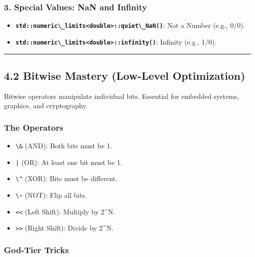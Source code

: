 \hypertarget{special-values-nan-and-infinity}{%
\subsubsection{3. Special Values: NaN and
Infinity}\label{special-values-nan-and-infinity}}

\begin{itemize}
\tightlist
\item
  \textbf{\passthrough{\lstinline!std::numeric\_limits<double>::quiet\_NaN()!}}:
  Not a Number (e.g., 0/0).
\item
  \textbf{\passthrough{\lstinline!std::numeric\_limits<double>::infinity()!}}:
  Infinity (e.g., 1/0).
\end{itemize}

\begin{center}\rule{0.5\linewidth}{0.5pt}\end{center}

\hypertarget{bitwise-mastery-low-level-optimization}{%
\subsection{4.2 Bitwise Mastery (Low-Level
Optimization)}\label{bitwise-mastery-low-level-optimization}}

Bitwise operators manipulate individual bits. Essential for embedded
systems, graphics, and cryptography.

\hypertarget{the-operators}{%
\subsubsection{The Operators}\label{the-operators}}

\begin{itemize}
\tightlist
\item
  \passthrough{\lstinline!\&!} (AND): Both bits must be 1.
\item
  \passthrough{\lstinline!|!} (OR): At least one bit must be 1.
\item
  \passthrough{\lstinline!\^!} (XOR): Bits must be different.
\item
  \passthrough{\lstinline!\~!} (NOT): Flip all bits.
\item
  \passthrough{\lstinline!<<!} (Left Shift): Multiply by 2\^{}N.
\item
  \passthrough{\lstinline!>>!} (Right Shift): Divide by 2\^{}N.
\end{itemize}

\hypertarget{god-tier-tricks}{%
\subsubsection{God-Tier Tricks}\label{god-tier-tricks}}

